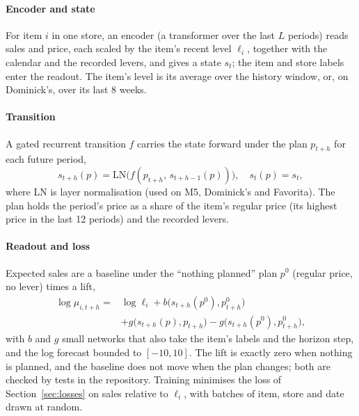 \paragraph{Encoder and state}
For item $i$ in one store, an encoder (a transformer over the last $L$
periods) reads sales and price, each scaled by the item's recent level
$\ell_i$, together with the calendar and the recorded levers, and gives a
state $s_t$; the item and store labels enter the readout. The item's level is
its average over the history window, or, on Dominick's, over its last 8 weeks.

\paragraph{Transition}
A gated recurrent transition $f$ carries the state forward under the plan
$p_{t+h}$ for each future period,
\begin{equation}
s_{t+h}(p) = \mathrm{LN}\big(f(p_{t+h},\, s_{t+h-1}(p))\big), \quad s_t(p) = s_t,
\end{equation}
where LN is layer normalisation (used on M5, Dominick's and Favorita). The plan
holds the period's price as a share of the item's regular price (its highest
price in the last 12 periods) and the recorded levers.

\paragraph{Readout and loss}
Expected sales are a baseline under the ``nothing planned'' plan $p^0$ (regular
price, no lever) times a lift,
\begin{equation}
\begin{split}
\log \mu_{i,t+h} = {} & \log \ell_i + b\big(s_{t+h}(p^0), p^0_{t+h}\big) \\
 & + g\big(s_{t+h}(p), p_{t+h}\big) - g\big(s_{t+h}(p^0), p^0_{t+h}\big),
\end{split}
\end{equation}
with $b$ and $g$ small networks that also take the item's labels and the
horizon step, and the log forecast bounded to $[-10, 10]$. The lift is exactly
zero when nothing is planned, and the baseline does not move when the plan
changes; both are checked by tests in the repository. Training minimises the
loss of Section~\ref{sec:losses} on sales relative to $\ell_i$, with batches of
item, store and date drawn at random.

